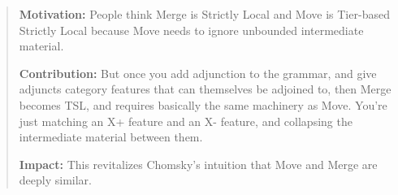
\begin{abstract}
\textbf{Motivation:} People think Merge is Strictly Local and Move is Tier-based Strictly Local because Move needs to ignore unbounded intermediate material.

\textbf{Contribution:} But once you add adjunction to the grammar, and give adjuncts category features that can themselves be adjoined to, then Merge becomes TSL, and requires basically the same machinery as Move. You're just matching an X+ feature and an X- feature, and collapsing the intermediate material between them.

\textbf{Impact:} This revitalizes Chomsky's intuition that Move and Merge are deeply similar.
\end{abstract}
